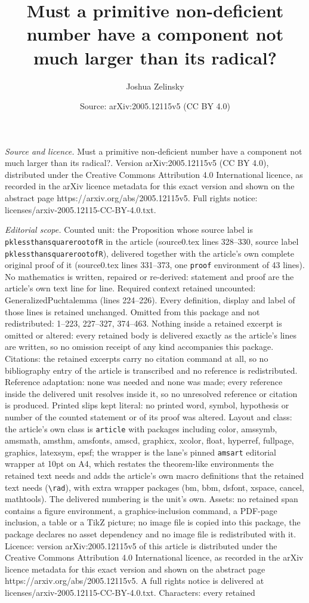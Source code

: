 \documentclass[10pt,a4paper]{amsart}
\title[Must a primitive non-deficient number have a component not m]{Must a primitive non-deficient number have a component not much larger than its radical?}
\author{Joshua Zelinsky}
\date{Source: arXiv:2005.12115v5 (CC BY 4.0)}
\begin{document}
\maketitle

\noindent\emph{Source and licence.} Must a primitive non-deficient number have a component not much larger than its radical?. Version arXiv:2005.12115v5 (CC BY 4.0), distributed under the Creative Commons Attribution 4.0 International licence, as recorded in the arXiv licence metadata for this exact version and shown on the abstract page https://arxiv.org/abs/2005.12115v5. Full rights notice: licenses/arxiv-2005.12115-CC-BY-4.0.txt.\par\smallskip

\noindent\textit{Editorial scope.} Counted unit: the Proposition whose source label is \texttt{pklessthansquarerootofR} in the article (source0.tex lines 328--330, source label \texttt{pklessthansquarerootofR}), delivered together with the article's own complete original proof of it (source0.tex lines 331--373, one \texttt{proof} environment of 43 lines). No mathematics is written, repaired or re-derived: statement and proof are the article's own text line for line. Required context retained uncounted: GeneralizedPuchtalemma (lines 224--226). Every definition, display and label of those lines is retained unchanged. Omitted from this package and not redistributed: 1--223, 227--327, 374--463. Nothing inside a retained excerpt is omitted or altered: every retained body is delivered exactly as the article's lines are written, so no omission receipt of any kind accompanies this package. Citations: the retained excerpts carry no citation command at all, so no bibliography entry of the article is transcribed and no reference is redistributed. Reference adaptation: none was needed and none was made; every reference inside the delivered unit resolves inside it, so no unresolved reference or citation is produced. Printed slips kept literal: no printed word, symbol, hypothesis or number of the counted statement or of its proof was altered. Layout and class: the article's own class is \texttt{article} with packages including color, amssymb, amsmath, amsthm, amsfonts, amscd, graphicx, xcolor, float, hyperref, fullpage, graphics, latexsym, epsf; the wrapper is the lane's pinned \texttt{amsart} editorial wrapper at 10pt on A4, which restates the theorem-like environments the retained text needs and adds the article's own macro definitions that the retained text needs (\texttt{\textbackslash rad}), with extra wrapper packages (bm, bbm, dsfont, xspace, cancel, mathtools). The delivered numbering is the unit's own. Assets: no retained span contains a figure environment, a graphics-inclusion command, a PDF-page inclusion, a table or a TikZ picture; no image file is copied into this package, the package declares no asset dependency and no image file is redistributed with it. Licence: version arXiv:2005.12115v5 of this article is distributed under the Creative Commons Attribution 4.0 International licence, as recorded in the arXiv licence metadata for this exact version and shown on the abstract page https://arxiv.org/abs/2005.12115v5. A full rights notice is delivered at licenses/arxiv-2005.12115-CC-BY-4.0.txt. Characters: every retained 
\end{document}
